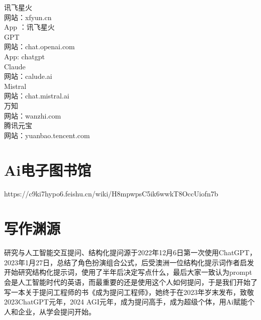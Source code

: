 \documentclass[12pt]{book}
\begin{document}
	讯飞星火\\
	网站：xfyun.cn \\
	App ：讯飞星火 \\
	
	GPT\\
	网站：chat.openai.com\\
	App: chatgpt\\
	
	
	Claude\\
	网站：calude.ai\\
	
	Mistral\\
	网站：chat.mistral.ai\\
	
	万知\\
	网站：wanzhi.com\\ 
	
	腾讯元宝\\
	网站：yuanbao.tencent.com\\ 
	
	

\section{Ai电子图书馆}

	https://c9ki7hypo6.feishu.cn/wiki/H8mpwpsC5ik6wwkT8OccUiofn7b
	

	
	\section{写作渊源}
	研究与人工智能交互提问、结构化提问源于2022年12月6日第一次使用ChatGPT，2023年1月27日，总结了角色扮演组合公式，后受澳洲一位结构化提示词作者启发开始研究结构化提示词，使用了半年后决定写点什么，最后大家一致认为prompt会是人工智能时代的英语，而最重要的还是使用这个人如何提问，于是我们开始了写一本关于提问工程师的书《成为提问工程师》，她终于在2023年岁末发布，致敬2023ChatGPT元年，2024 AGI元年，成为提问高手，成为超级个体，用Ai赋能个人和企业，从学会提问开始。
	
\end{document}
